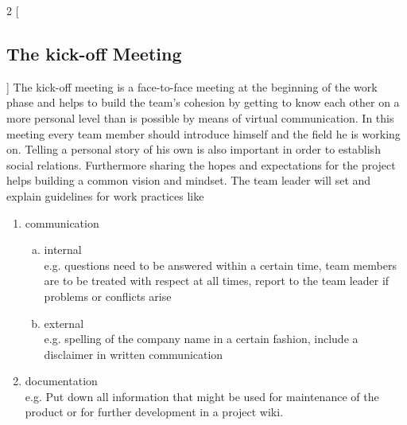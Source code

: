 \begin{multicols}{2}
[\subsection{The kick-off Meeting}]
The kick-off meeting is a face-to-face meeting at the beginning of the work phase and helps to build the team’s cohesion by getting to know each other on a more personal level than is possible by means of virtual communication.
In this meeting every team member should introduce himself and the field he is working on. Telling a personal story of his own is also important in order to establish social relations. Furthermore sharing the hopes and expectations for the project helps building a common vision and mindset.
The team leader will set and explain guidelines for work practices like
  \begin{enumerate}[1.]
	\item communication
		\begin{enumerate}[a)]
		  	\item internal\\ 
				e.g. questions need to be answered within a certain time, team members are to be treated with respect at all times, report to the team leader if problems or conflicts arise
			\item external\\
				e.g. spelling of the company name in a certain fashion, include a disclaimer in written communication
		\end{enumerate}
	\item documentation\\
e.g. Put down all information that might be used for maintenance of the product or for further development in a project wiki.
  \end{enumerate}
\end{multicols}